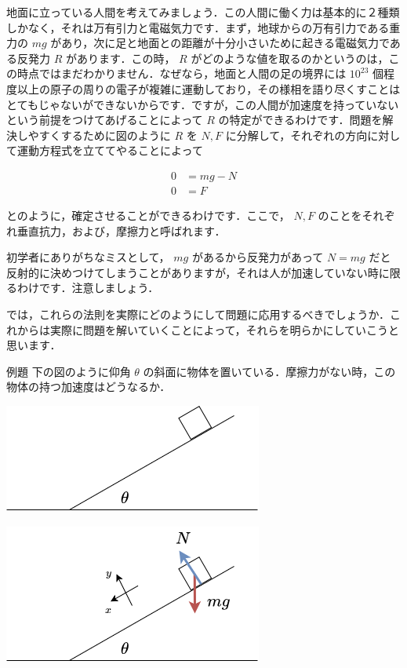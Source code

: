 \documentclass[
  b4paperpaper,
  xelatex,ja=standard]{bxjsbook}
\begin{document}
地面に立っている人間を考えてみましょう．この人間に働く力は基本的に２種類しかなく，それは万有引力と電磁気力です．まず，地球からの万有引力である重力の
\(mg\)
があり，次に足と地面との距離が十分小さいために起きる電磁気力である反発力
\(R\) があります．この時， \(R\)
がどのような値を取るのかというのは，この時点ではまだわかりません．なぜなら，地面と人間の足の境界には
\(10^{23}\)
個程度以上の原子の周りの電子が複雑に運動しており，その様相を語り尽くすことはとてもじゃないができないからです．ですが，この人間が加速度を持っていないという前提をつけてあげることによって
\(R\) の特定ができるわけです．問題を解決しやすくするために図のように
\(R\) を \(N,F\)
に分解して，それぞれの方向に対して運動方程式を立ててやることによって

\begin{align*}
0&=mg-N\\
0&=F
\end{align*}

とのように，確定させることができるわけです．ここで， \(N,F\)
のことをそれぞれ垂直抗力，および，摩擦力と呼ばれます．

初学者にありがちなミスとして， \(mg\) があるから反発力があって \(N=mg\)
だと反射的に決めつけてしまうことがありますが，それは人が加速していない時に限るわけです．注意しましょう．

では，これらの法則を実際にどのようにして問題に応用するべきでしょうか．これからは実際に問題を解いていくことによって，それらを明らかにしていこうと思います．

\begin{Rbox}{例題}
下の図のように仰角 \(\theta\)
の斜面に物体を置いている．摩擦力がない時，この物体の持つ加速度はどうなるか．

\includegraphics{source/images/newton/newton3.png}

\end{Rbox}


\includegraphics{source/images/newton/newton4.png}
\end{document}
